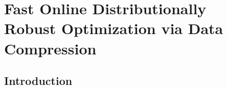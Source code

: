 \chapter{Fast Online Distributionally Robust Optimization via Data Compression}
\label{chap:online_dro}

\glsresetall

\section{Introduction}

